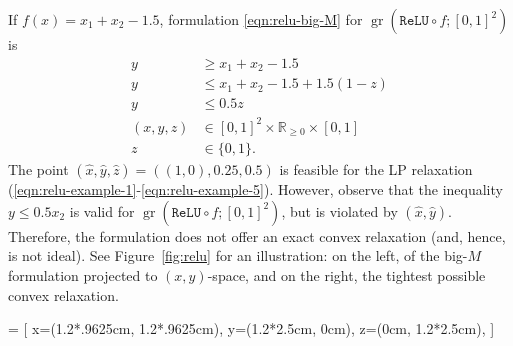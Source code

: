 \documentclass[smallextended]{svjour3}
\newcommand{\bbR}{\mathbb{R}}
\newcommand{\Conv}{\operatorname{Conv}}
\newcommand{\gr}{\operatorname{gr}}
\newcommand{\ReLu}{\texttt{ReLU}}
\begin{document}
\begin{example} \label{ex:relu-big-M}
    If $f(x) = x_1 + x_2 - 1.5$, formulation \eqref{eqn:relu-big-M} for $\gr(\ReLu{} \circ f; [0,1]^2)$ is
    \begin{subequations}
    \begin{align}
        y &\geq x_1 + x_2 - 1.5 \label{eqn:relu-example-1} \\ 
        y &\leq x_1 + x_2 - 1.5 + 1.5(1-z) \\
        y &\leq 0.5z \\
        (x,y,z) &\in [0,1]^2\times \bbR_{\geq 0} \times [0,1] \label{eqn:relu-example-5} \\
        z &\in \{0,1\}.
    \end{align}
    \end{subequations}
    The point $(\hat{x},\hat{y},\hat{z}) = ((1,0),0.25,0.5)$ is feasible for the LP relaxation (\ref{eqn:relu-example-1}-\ref{eqn:relu-example-5}). However, observe that the inequality $y \leq 0.5x_2$ is valid for $\gr(\ReLu{} \circ f; [0,1]^2)$, but is violated by $(\hat{x},\hat{y})$. Therefore, the formulation does not offer an exact convex relaxation (and, hence, is not ideal). See Figure~\ref{fig:relu} for an illustration: on the left, of the big-$M$ formulation projected to $(x,y)$-space, and on the right, the tightest possible convex relaxation.
\end{example}

 = [
  x={(1.2*.9625cm, 1.2*.9625cm)},
  y={(1.2*2.5cm, 0cm)},
  z={(0cm, 1.2*2.5cm)},
]
\end{document}
